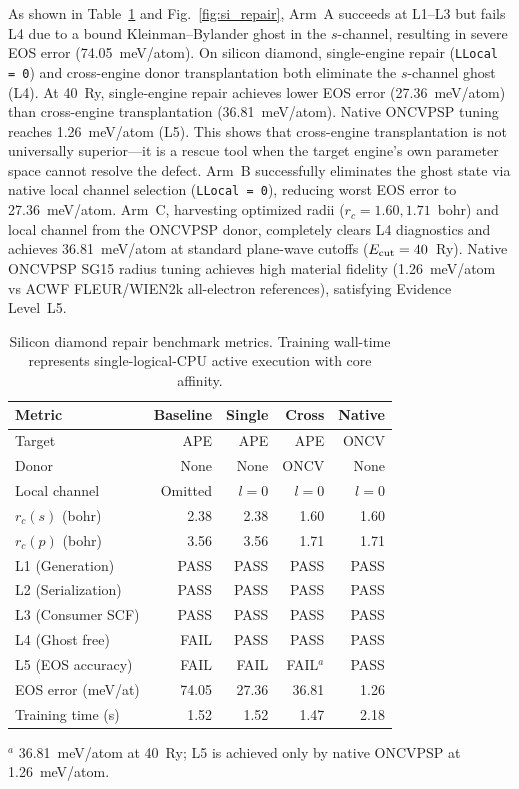 \documentclass[3p,twocolumn]{elsarticle}
\begin{document}
As shown in Table~\ref{tab:si_benchmark} and Fig.~\ref{fig:si_repair}, Arm~A succeeds at L1--L3 but fails L4 due to a bound Kleinman--Bylander ghost in the $s$-channel, resulting in severe EOS error (74.05~meV/atom). On silicon diamond, single-engine repair (\texttt{LLocal = 0}) and cross-engine donor transplantation both eliminate the $s$-channel ghost (L4). At 40~Ry, single-engine repair achieves lower EOS error (27.36~meV/atom) than cross-engine transplantation (36.81~meV/atom). Native ONCVPSP tuning reaches 1.26~meV/atom (L5). This shows that cross-engine transplantation is not universally superior---it is a rescue tool when the target engine's own parameter space cannot resolve the defect. Arm~B successfully eliminates the ghost state via native local channel selection (\texttt{LLocal = 0}), reducing worst EOS error to 27.36~meV/atom. Arm~C, harvesting optimized radii ($r_c = 1.60, 1.71$~bohr) and local channel from the ONCVPSP donor, completely clears L4 diagnostics and achieves 36.81~meV/atom at standard plane-wave cutoffs ($E_{\rm cut} = 40$~Ry). Native ONCVPSP SG15 radius tuning achieves high material fidelity (1.26~meV/atom vs ACWF FLEUR/WIEN2k all-electron references), satisfying Evidence Level~L5.

\begin{table}[t]
\centering
\caption{Silicon diamond repair benchmark metrics. Training wall-time represents single-logical-CPU active execution with core affinity.}
\label{tab:si_benchmark}
\footnotesize
\setlength{\tabcolsep}{1.8pt}
\begin{tabular*}{\columnwidth}{@{\extracolsep{\fill}}lrrrr@{}}
\toprule
Metric & Baseline & Single & Cross & Native \\
\midrule
Target & APE & APE & APE & ONCV \\
Donor & None & None & ONCV & None \\
Local channel & Omitted & $l=0$ & $l=0$ & $l=0$ \\
$r_c(s)$ (bohr) & 2.38 & 2.38 & 1.60 & 1.60 \\
$r_c(p)$ (bohr) & 3.56 & 3.56 & 1.71 & 1.71 \\
L1 (Generation) & PASS & PASS & PASS & PASS \\
L2 (Serialization) & PASS & PASS & PASS & PASS \\
L3 (Consumer SCF) & PASS & PASS & PASS & PASS \\
L4 (Ghost free) & FAIL & PASS & PASS & PASS \\
L5 (EOS accuracy) & FAIL & FAIL & FAIL$^a$ & PASS \\
EOS error (meV/at) & 74.05 & 27.36 & 36.81 & 1.26 \\
Training time (s) & 1.52 & 1.52 & 1.47 & 2.18 \\
\bottomrule
\end{tabular*}
\par\smallskip
\raggedright\scriptsize
$^a$ 36.81~meV/atom at 40~Ry; L5 is achieved only by native ONCVPSP at 1.26~meV/atom.
\end{table}
\end{document}
